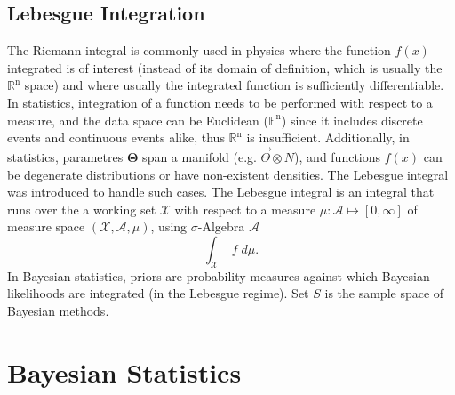 \subsection*{Lebesgue Integration}
The Riemann integral is commonly used in physics where the function $f(x)$ integrated is of interest (instead of its domain of definition, which is usually the $\mathbb{R}^{\mbox{n}}$ space) and where usually the integrated function is sufficiently differentiable.\\
In statistics, integration of a function needs to be performed with respect to a measure, and the data space can be Euclidean ($\mathbb{E}^{\mbox{n}}$) since it includes discrete events and continuous events alike, thus $\mathbb{R}^{\mbox{n}}$ is insufficient. Additionally, in statistics, parametres $\mathbf{\Theta}$ span a manifold (e.g. $\vec\Theta \otimes N $), and functions $f(x)$ can be degenerate distributions or have non-existent densities. The Lebesgue integral was introduced to handle such cases. The Lebesgue integral is an integral that runs over the a working set $\mathcal{X}$ with respect to a measure $\mu : \mathcal{A} \mapsto[0, \infty]$ of measure space $(\mathcal{X}, \mathcal{A}, \mu)$, using $\sigma$-Algebra $\mathcal{A}$ 
\begin{equation*}
    \int_{\mathcal{X}} \; f \; d\mu .
\end{equation*}
In Bayesian statistics, priors are probability measures against which Bayesian likelihoods are integrated (in the Lebesgue regime). Set $S$ is the sample space of Bayesian methods.


\section{Bayesian Statistics}


